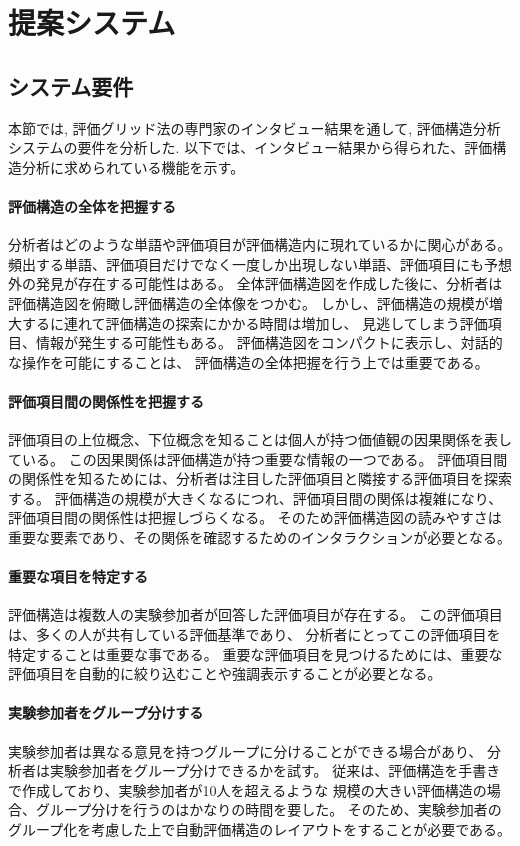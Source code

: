 \documentclass[syuuron]{kuee}
\begin{document}
\chapter{提案システム}
	\section{システム要件}
		本節では, 評価グリッド法の専門家のインタビュー結果\cite{hak1}を通して, 評価構造分析システムの要件を分析した. 
		以下では、インタビュー結果から得られた、評価構造分析に求められている機能を示す。
		\subsubsection{評価構造の全体を把握する}
			分析者はどのような単語や評価項目が評価構造内に現れているかに関心がある。
			頻出する単語、評価項目だけでなく一度しか出現しない単語、評価項目にも予想外の発見が存在する可能性はある。
			全体評価構造図を作成した後に、分析者は評価構造図を俯瞰し評価構造の全体像をつかむ。
			しかし、評価構造の規模が増大するに連れて評価構造の探索にかかる時間は増加し、
			見逃してしまう評価項目、情報が発生する可能性もある。
			評価構造図をコンパクトに表示し、対話的な操作を可能にすることは、
			評価構造の全体把握を行う上では重要である。
		\subsubsection{評価項目間の関係性を把握する}
			評価項目の上位概念、下位概念を知ることは個人が持つ価値観の因果関係を表している。
			この因果関係は評価構造が持つ重要な情報の一つである。
			評価項目間の関係性を知るためには、分析者は注目した評価項目と隣接する評価項目を探索する。
			評価構造の規模が大きくなるにつれ、評価項目間の関係は複雑になり、評価項目間の関係性は把握しづらくなる。
			そのため評価構造図の読みやすさは重要な要素であり、その関係を確認するためのインタラクションが必要となる。
		\subsubsection{重要な項目を特定する}
			評価構造は複数人の実験参加者が回答した評価項目が存在する。
			この評価項目は、多くの人が共有している評価基準であり、
			分析者にとってこの評価項目を特定することは重要な事である。
			重要な評価項目を見つけるためには、重要な評価項目を自動的に絞り込むことや強調表示することが必要となる。
		\subsubsection{実験参加者をグループ分けする}
			実験参加者は異なる意見を持つグループに分けることができる場合があり、
			分析者は実験参加者をグループ分けできるかを試す。
			従来は、評価構造を手書きで作成しており、実験参加者が10人を超えるような
			規模の大きい評価構造の場合、グループ分けを行うのはかなりの時間を要した。
			そのため、実験参加者のグループ化を考慮した上で自動評価構造のレイアウトをすることが必要である。
\end{document}
